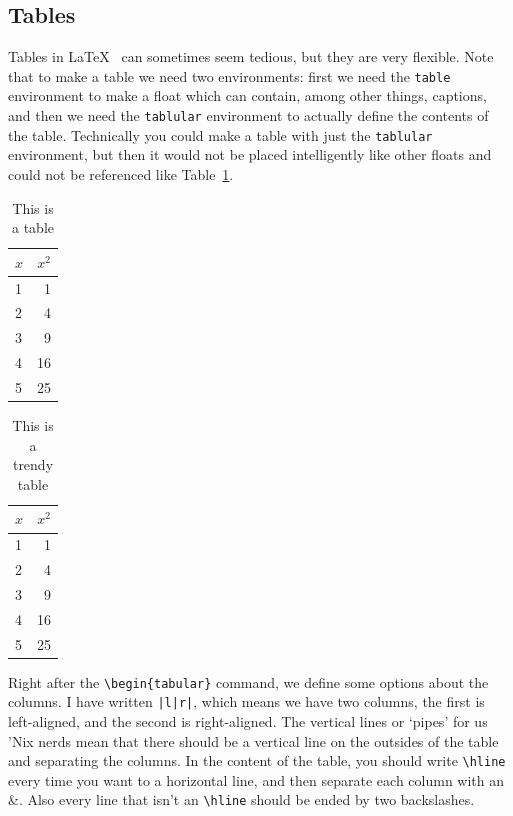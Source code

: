 \documentclass[twocolumn,10 pt,showpacs,preprintnumbers,amsmath,amssymb]{revtex4-1}
\begin{document}
\subsection{Tables}

Tables in \LaTeX~ can sometimes seem tedious, but they are very
flexible. Note that to make a table we need two environments: first we
need the \texttt{table} environment to make a float which can contain,
among other things, captions, and then we need the \texttt{tablular}
environment to actually define the contents of the table. Technically
you could make a table with just the \texttt{tablular} environment, but
then it would not be placed intelligently like other floats and could
not be referenced like Table~\ref{tbl:sqr}.
\begin{table}
  \centering
  \begin{tabular}{|l|r|} \hline
    $x$  &  $x^2$ \\ \hline
    1    &  1  		\\
    2    &  4  		\\
    3    &  9  		\\
    4    &  16 		\\
    5    &  25 		\\ \hline
  \end{tabular}
  \caption{This is a table}
  \label{tbl:sqr}
\end{table}
\begin{table}
  \centering
  \begin{tabular}{lr} \hline \hline
    $x$  &  $x^2$\\ \hline
      1  &  1  \\
      2  &  4  \\
      3  &  9  \\
      4  &  16 \\
      5  &  25 \\ \hline
  \end{tabular}
  \caption{This is a trendy table}
  \label{tbl:trendy}
\end{table}
Right after the \verb_\begin{tabular}_ command, we define some options
about the columns. I have written \texttt{|l|r|}, which means we have
two columns, the first is left-aligned, and the second is right-aligned.
The vertical lines or `pipes' for us 'Nix nerds mean that there should
be a vertical line on the outsides of the table and separating the
columns. In the content of the table, you should write \verb_\hline_
every time you want to a horizontal line, and then separate each column
with an \&. Also every line that isn't an \verb_\hline_ should be ended
by two backslashes.
\end{document}
